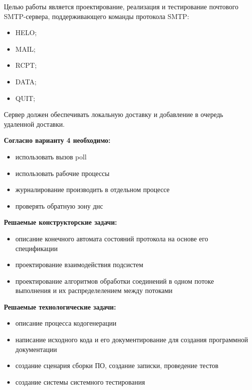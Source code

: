 \Introduction

Целью работы является проектирование, реализация и тестирование почтового SMTP-сервера, поддерживающего команды протокола SMTP:

\begin{itemize}
\item HELO;
\item MAIL;
\item RCPT;
\item DATA;
\item QUIT;
\end{itemize}

Сервер должен обеспечивать локальную доставку и добавление в очередь удаленной доставки.

\textbf{Согласно варианту 4 необходимо:}

\begin{itemize}
\item использовать вызов poll
\item использовать рабочие процессы
\item журналирование производить в отдельном процессе
\item проверять обратную зону днс
\end{itemize}

\textbf{Решаемые конструкторские задачи:}
\begin{itemize}
\item описание конечного автомата состояний протокола на основе его спецификации%
\item проектирование взаимодействия подсистем
\item проектирование алгоритмов обработки соединений в одном потоке выполнения и их распределелением между потоками
\end{itemize}

\textbf{Решаемые технологические задачи:}
\begin{itemize}
\item описание процесса кодогенерации
\item написание исходного кода и его документирование для создания программной документации
\item создание сценария сборки ПО, создание записки, проведение тестов
\item создание системы системного тестирования
\end{itemize}
